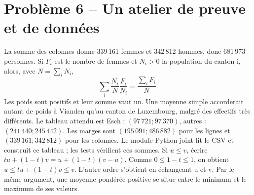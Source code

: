 \section*{Problème 6 -- Un atelier de preuve et de données}
La somme des colonnes donne $339\,161$ femmes et $342\,812$ hommes, donc $681\,973$ personnes. Si $F_i$ est le nombre de femmes et $N_i>0$ la population du canton i, alors, avec $N=\sum_iN_i$,
\[
\sum_i\frac{N_i}{N}\frac{F_i}{N_i}
=\frac{\sum_iF_i}{N}.
\]
Les poids sont positifs et leur somme vaut un. Une moyenne simple accorderait autant de poids à Vianden qu'au canton de Luxembourg, malgré des effectifs très différents.
Le tableau attendu est Esch : $(97\,721;97\,370)$, autres : $(241\,440;245\,442)$. Les marges sont $(195\,091;486\,882)$ pour les lignes et $(339\,161;342\,812)$ pour les colonnes. Le module Python joint lit le CSV et construit ce tableau ; les tests vérifient ces sommes.
Si $u\le v$, écrire $tu+(1-t)v=u+(1-t)(v-u)$. Comme $0\le1-t\le1$, on obtient $u\le tu+(1-t)v\le v$. L'autre ordre s'obtient en échangeant u et v. Par le même argument, une moyenne pondérée positive se situe entre le minimum et le maximum de ses valeurs.
